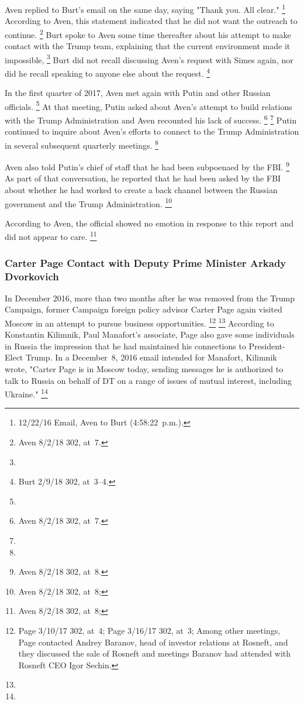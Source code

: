 Aven replied to Burt's email on the same day, saying "Thank you. All clear."%
\footnote{12/22/16 Email, Aven to Burt (4:58:22~p.m.).}
According to Aven, this statement indicated that he did not want the outreach to continue.%
\footnote{Aven 8/2/18 302, at~7.}
Burt spoke to Aven some time thereafter about his attempt to make contact with the Trump team, explaining that the current environment made it impossible,
\footnote{}
Burt did not recall discussing Aven's request with Simes again, nor did he recall speaking to anyone else about the request.%
\footnote{Burt 2/9/18 302, at~3--4.}

In the first quarter of 2017, Aven met again with Putin and other Russian officials.%
\footnote{}
At that meeting, Putin asked about Aven's attempt to build relations with the Trump Administration and Aven recounted his lack of success.%
\footnote{ Aven 8/2/18 302, at~7.}
\footnote{}
Putin continued to inquire about Aven's efforts to connect to the Trump Administration in several subsequent quarterly meetings.%
\footnote{}

Aven also told Putin's chief of staff that he had been subpoenaed by the FBI\null.%
\footnote{Aven 8/2/18 302, at~8.}
As part of that conversation, he reported that he had been asked by the FBI about whether he had worked to create a back channel between the Russian government and the Trump Administration.%
\footnote{Aven 8/2/18 302, at~8; }

According to Aven, the official showed no emotion in response to this report and did not appear to care.%
\footnote{Aven 8/2/18 302, at~8; }

\subsubsection{Carter Page Contact with Deputy Prime Minister Arkady Dvorkovich}

In December 2016, more than two months after he was removed from the Trump Campaign, former Campaign foreign policy advisor Carter Page again visited Moscow in an attempt to pursue business opportunities.%
\footnote{Page 3/10/17 302, at~4;
Page 3/16/17 302, at~3;
 Among other meetings, Page contacted Andrey Baranov, head of investor relations at Rosneft, and they discussed the sale of Rosneft and meetings Baranov had attended with Rosneft CEO Igor Sechin.
}
\footnote{}
According to Konstantin Kilimnik, Paul Manafort's associate, Page also gave some individuals in Russia the impression that he had maintained his connections to President-Elect Trump.
In a December~8, 2016 email intended for Manafort, Kilimnik wrote, "Carter Page is in Moscow today, sending messages he is authorized to talk to Russia on behalf of DT on a range of issues of mutual interest, including Ukraine."%
\footnote{}

